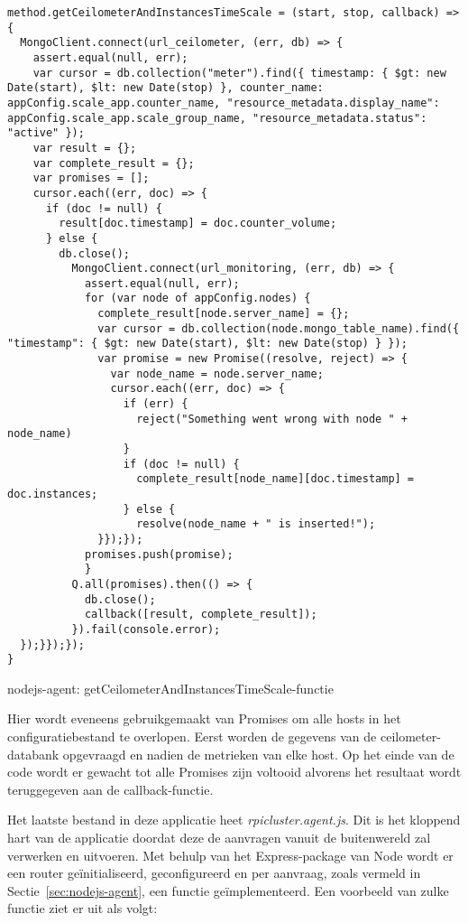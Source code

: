 \begin{code}
\begin{verbatim}
method.getCeilometerAndInstancesTimeScale = (start, stop, callback) => {
  MongoClient.connect(url_ceilometer, (err, db) => {
    assert.equal(null, err);
    var cursor = db.collection("meter").find({ timestamp: { $gt: new Date(start), $lt: new Date(stop) }, counter_name: appConfig.scale_app.counter_name, "resource_metadata.display_name": appConfig.scale_app.scale_group_name, "resource_metadata.status": "active" });
    var result = {};
    var complete_result = {};
    var promises = [];
    cursor.each((err, doc) => {
      if (doc != null) {
        result[doc.timestamp] = doc.counter_volume;
      } else {
        db.close();
          MongoClient.connect(url_monitoring, (err, db) => {
            assert.equal(null, err);
            for (var node of appConfig.nodes) {
              complete_result[node.server_name] = {};
              var cursor = db.collection(node.mongo_table_name).find({ "timestamp": { $gt: new Date(start), $lt: new Date(stop) } });
              var promise = new Promise((resolve, reject) => {
                var node_name = node.server_name;
                cursor.each((err, doc) => {
                  if (err) {
                    reject("Something went wrong with node " + node_name)
                  }
                  if (doc != null) {
                    complete_result[node_name][doc.timestamp] = doc.instances;
                  } else {
                    resolve(node_name + " is inserted!");
              }});});
            promises.push(promise);
            }
          Q.all(promises).then(() => {
            db.close();
            callback([result, complete_result]);
          }).fail(console.error);
  });}});});
}
\end{verbatim}
\caption{nodejs-agent: getCeilometerAndInstancesTimeScale-functie}
\end{code}

Hier wordt eveneens gebruikgemaakt van Promises om alle hosts in het configuratiebestand te overlopen. Eerst worden de gegevens van de ceilometer-databank opgevraagd en nadien de metrieken van elke host. Op het einde van de code wordt er gewacht tot alle Promises zijn voltooid alvorens het resultaat wordt teruggegeven aan de callback-functie.

Het laatste bestand in deze applicatie heet \textit{rpicluster.agent.js}. Dit is het kloppend hart van de applicatie doordat deze de aanvragen vanuit de buitenwereld zal verwerken en uitvoeren. Met behulp van het Express-package van Node wordt er een router geïnitialiseerd, geconfigureerd en per aanvraag, zoals vermeld in Sectie~\ref{sec:nodejs-agent}, een functie geïmplementeerd. Een voorbeeld van zulke functie ziet er uit als volgt:

